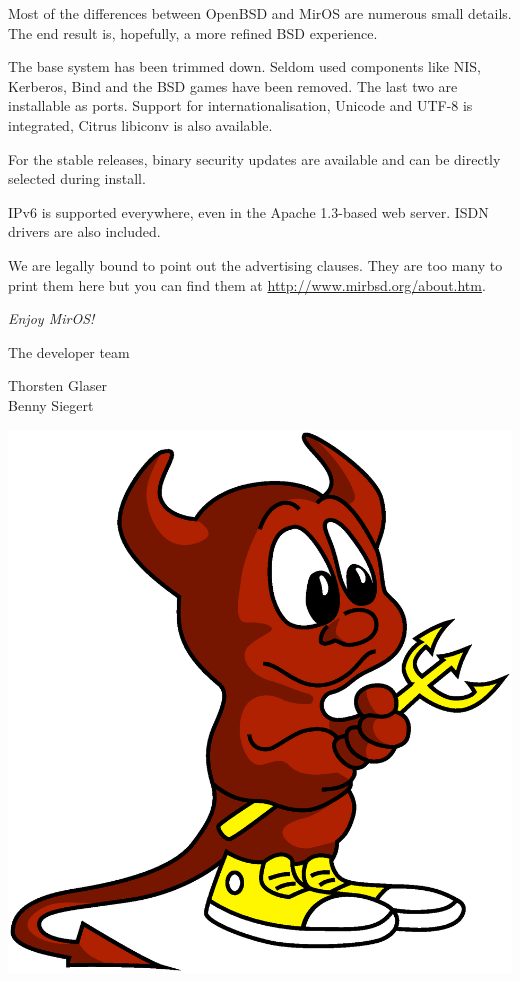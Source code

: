 \documentclass[a4paper,landscape,11pt,notumble]{leaflet}
\begin{document}
Most of the differences between OpenBSD and MirOS are numerous small details. The end result is, hopefully, a more refined BSD experience.

The base system has been trimmed down. Seldom used components like NIS, Kerberos, Bind and the BSD games have been removed. The last two are installable as ports. Support for internationalisation, Unicode and UTF-8 is integrated, Citrus libiconv is also available.

For the stable releases, binary security updates are available and can be directly selected during install.

IPv6 is supported everywhere, even in the Apache 1.3-based web server. ISDN drivers are also included.

We are legally bound to point out the advertising clauses. They are too many to print them here but you can find them at \url{http://www.mirbsd.org/about.htm}.

\newpage


\graybox\par
\begin{center}
\vspace{3ex}
{\Large\itshape
Enjoy MirOS!\par\medskip
The developer team\par\medskip
\color{darkred}%
Thorsten Glaser\\
Benny Siegert\par
}

\vfill

\includegraphics[width=0.75\columnwidth]{img/bsdaemon}

\vfill%
\end{center}%
\end{document}
